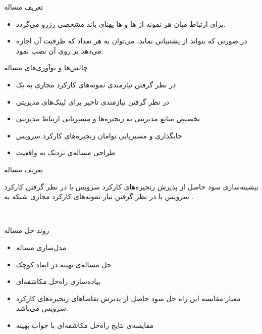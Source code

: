 \documentclass{beamer}
\makeatletter
\newcommand{\RTList}{\raggedleft\rightskip\@totalleftmargin}
\makeatother
\begin{document}
\begin{persian}
\begin{frame}{تعریف مساله}
\begin{itemize}
        \item برای ارتباط میان هر نمونه از ها و ها پهنای باند مشخصی رزرو می‌گردد.
        \item در صورتی که  بتواند از  پشتیبانی نماید،
        می‌توان به هر تعداد که ظرفیت آن اجازه می‌دهد بر روی آن  نصب نمود.
    \end{itemize}
\end{frame}
\begin{frame}{چالش‌ها و نوآوری‌های مساله}
    \begin{itemize}\RTList{}
        \justifying
        \item در نظر گرفتن نیازمندی نمونه‌های کارکرد مجازی به یک 
        \item در نظر گرفتن نیازمندی تاخیر برای لینک‌های مدیریتی
        \item تخصیص منابع مدیریتی به زنجیره‌ها و مسیریابی ارتباط مدیریتی
        \item جایگذاری و مسیریابی توامان زنجیره‌های کارکرد سرویس
        \item طراحی مساله‌ی نزدیک به واقعیت
    \end{itemize}
\end{frame}
\begin{frame}{تعریف مساله}
    \begin{block}{}
        بیشینه‌سازی سود حاصل از پذیرش زنجیره‌های کارکرد سرویس با در نظر گرفتن کارکرد سرویس با در نظر گرفتن نیاز نمونه‌های کارکرد
        مجازی شبکه به .
    \end{block}
\end{frame}‌
\begin{frame}{روند حل مساله}
    \begin{itemize}\RTList{}
        \justifying
        \item مدل‌سازی مساله
        \item حل مساله‌ی بهینه در ابعاد کوچک
        \item پیاده‌سازی راه‌حل مکاشفه‌ای
        \item معیار مقایسه این راه حل سود حاصل از پذیرش تقاضاهای زنجیره‌های کارکرد سرویس می‌باشد.
        \item مقایسه‌ی نتایج راه‌حل مکاشفه‌ای با جواب بهینه
    \end{itemize}
\end{frame}
\begin{frame}{}

\end{frame}
\end{persian}
\end{document}
